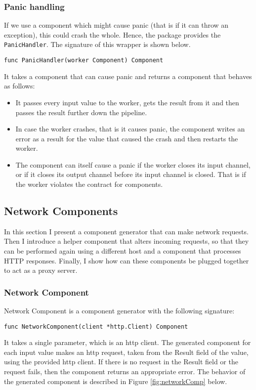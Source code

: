 \subsubsection{Panic handling}
If we use a component which might cause panic (that is if it can 
throw an exception), this could crash the whole. 
Hence, the package provides the 
\texttt{PanicHandler}. The signature of this wrapper is shown 
below.
\begin{lstlisting}
func PanicHandler(worker Component) Component
\end{lstlisting}
It takes a component that can cause panic and returns a component that 
behaves as follows:
\begin{itemize}
	\item It passes every input value to the worker, gets the result 
        from it and then passes the result further down the pipeline.
	\item In case the worker crashes, that is it causes panic, the component 
        writes an error as a result for the value that caused the crash 
        and then restarts the worker.
	\item The component can itself cause a panic if the worker closes its 
        input channel, or if it closes its output channel before its input 
        channel is closed. That is if the worker violates the contract
        for components.
\end{itemize}

\subsection{Network Components}
In this section I present a component generator that can make network
requests. Then I introduce a helper component that alters incoming 
requests, so that they can be performed again using a different host
and a component that processes HTTP responses. Finally, I show how
can these components be plugged together to act as a proxy server. 

\subsubsection{Network Component}
Network Component is a component generator with the following signature:
\begin{lstlisting}
func NetworkComponent(client *http.Client) Component
\end{lstlisting}
It takes a single parameter, which is an http client.
The generated component for each input value makes an http request,
taken from the Result field of the value, using the provided http client.
If there is no request in the Result field or the request fails, then
the component returns an appropriate error. The behavior of the generated 
component is described in Figure \ref{fig:networkComp} below.

